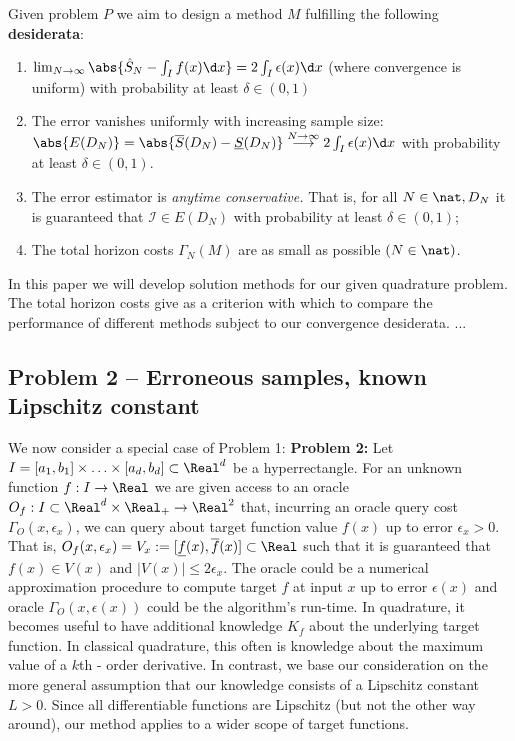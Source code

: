 Given problem $P$ we aim to design a method $M$ fulfilling the following \textbf{desiderata}:
\begin{enumerate}
 \item $\lim_{ N \to \infty} \abs{\hat S_N  - \int_I f(x) \d x} = 2 \int_I \epsilon(x) \d x$ (where convergence is uniform) with probability at least $\delta \in (0,1)$ 
 \item The error vanishes uniformly with increasing sample size: $\abs{E (D_N)} = \abs{\overline S(D_N) - \underline S(D_N)} \stackrel{N \to \infty}{\longrightarrow} 2 \int_I \epsilon(x) \d x$ with probability at least $\delta \in (0,1)$. 
\item The error estimator is \textit{anytime conservative.} That is, for all $N \in \nat, D_N$ it is guaranteed that $\mathcal I \in E (D_N)$ with probability at least $\delta \in (0,1)$;
\item The total horizon costs $\Gamma_N (M)$  are as small as possible $(N \in \nat)$. 
 \end{enumerate}

In this paper we will develop solution methods for our given quadrature problem. The total horizon costs give as a criterion with which to compare the performance of different methods subject to our convergence desiderata. ...


\subsection{Problem 2 -- Erroneous samples, known Lipschitz constant}
We now consider a special case of Problem 1:
\textbf{Problem 2:} Let $I=[a_1,b_1] \times \ldots \times [a_d,b_d] \subset \Real^d$ be a hyperrectangle. For an unknown function $f: I \to \Real$ we are given access to an oracle $O_f:  I \subset \Real^d \times \Real_+ \to \Real^2$ that, incurring  an oracle query cost $\Gamma_O(x,\epsilon_x)$, we can query about target function value $f(x)$ up to error $\epsilon_x > 0$. That is, $O_f(x,\epsilon_x) = V_x := [\underline f(x), \overline f(x)] \subset \Real$ such that it is guaranteed that $f(x) \in V(x) $ and $|V(x)| \leq 2 \epsilon_x$. The oracle could be a numerical approximation procedure to compute target $f$ at input $x$ up to error $\epsilon(x)$ and oracle $\Gamma_O(x,\epsilon(x) )$ could be the algorithm's run-time.
In quadrature, it becomes useful to have additional knowledge $K_f$ about the underlying target function. In classical quadrature, this often is knowledge about the maximum value of a $k$th - order derivative.  
In contrast, we base our consideration on the more general assumption that our knowledge consists of a Lipschitz constant $L >0$. Since all differentiable functions are Lipschitz (but not the other way around), our method applies to a wider scope of target functions.

